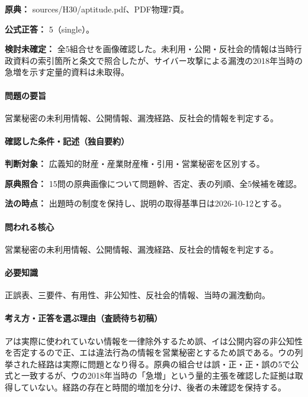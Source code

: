 \noindent\textbf{原典：} sources/H30/aptitude.pdf、PDF物理7頁。

\textbf{公式正答：} 5（single）。

\par\textbf{検討未確定：} 全5組合せを画像確認した。未利用・公開・反社会的情報は当時行政資料の索引箇所と条文で照合したが、サイバー攻撃による漏洩の2018年当時の急増を示す定量的資料は未取得。

\paragraph{問題の要旨} 営業秘密の未利用情報、公開情報、漏洩経路、反社会的情報を判定する。

\paragraph{確認した条件・記述（独自要約）}\mbox{}\par

\noindent\textbf{判断対象：} 広義知的財産・産業財産権・引用・営業秘密を区別する。\par

\noindent\textbf{原典照合：} 15問の原典画像について問題幹、否定、表の列順、全5候補を確認。\par

\noindent\textbf{法の時点：} 出題時の制度を保持し、説明の取得基準日は2026-10-12とする。\par

\paragraph{問われる核心} 営業秘密の未利用情報、公開情報、漏洩経路、反社会的情報を判定する。

\paragraph{必要知識} 正誤表、三要件、有用性、非公知性、反社会的情報、当時の漏洩動向。

\paragraph{考え方・正答を選ぶ理由（査読待ち初稿）} アは実際に使われていない情報を一律除外するため誤、イは公開内容の非公知性を否定するので正、エは違法行為の情報を営業秘密とするため誤である。ウの列挙された経路は実際に問題となり得る。原典の組合せは誤・正・正・誤の5で公式と一致するが、ウの2018年当時の「急増」という量的主張を確認した証拠は取得していない。経路の存在と時間的増加を分け、後者の未確認を保持する。

